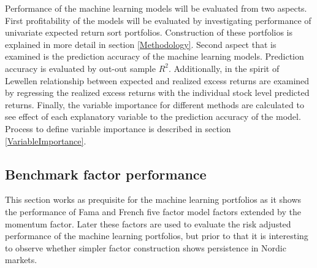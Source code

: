 \documentclass{article}
\begin{document}
Performance of the machine learning models will be evaluated from two aspects. First profitability of the models will be evaluated by investigating performance of univariate expected return sort portfolios. Construction of these portfolios is explained in more detail in section \ref{Methodology}. Second aspect that is examined is the prediction accuracy of the machine learning models. Prediction accuracy is evaluated by out-out sample $R^2$. Additionally, in the spirit of Lewellen \citeyear{Lewellen2015} relationship between expected and realized excess returns are examined by regressing the realized excess returns with the individual stock level predicted returns. Finally, the variable importance for different methods are calculated to see effect of each explanatory variable to the prediction accuracy of the model. Process to define variable importance is described in section \ref{VariableImportance}. \par

\subsection{Benchmark factor performance}\label{BenchmarkFactorPerformance}

This section works as prequisite for the machine learning portfolios as it shows the performance of Fama and French five factor \citeyear{FAMA20151} model factors extended by the momentum factor.  Later these factors are used to evaluate the risk adjusted performance of the machine learning portfolios, but prior to that it is interesting to observe whether simpler factor construction shows persistence in Nordic markets. \par
\end{document}
